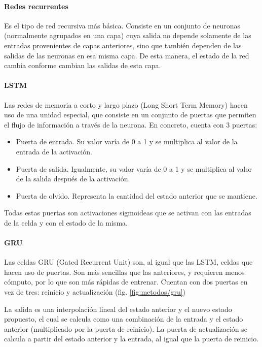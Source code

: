 \paragraph{Redes recurrentes}
Es el tipo de red recursiva más básica. Consiste en un conjunto de neuronas (normalmente agrupados en una capa) cuya salida no depende solamente de las entradas provenientes de capas anteriores, sino que también dependen de las salidas de las neuronas en esa misma capa. De esta manera, el estado de la red cambia conforme cambian las salidas de esta capa.
\paragraph{LSTM}
Las redes de memoria a corto y largo plazo (Long Short Term Memory) \cite{hochreiter1997long}\cite{colah} hacen uso de una unidad especial, que consiste en un conjunto de puertas que permiten el flujo de información a través de la neurona. En concreto, cuenta con 3 puertas:

\begin{itemize}
	\item Puerta de entrada. Su valor varía de 0 a 1 y se multiplica al valor de la entrada de la activación.
	\item Puerta de salida. Igualmente, su valor varía de 0 a 1 y se multiplica al valor de la salida después de la activación.
	\item Puerta de olvido. Representa la cantidad del estado anterior que se mantiene.
\end{itemize}

Todas estas puertas son activaciones sigmoideas que se activan con las entradas de la celda y con el estado de la misma.
\paragraph{GRU}
Las celdas GRU (Gated Recurrent Unit) \cite{chung2014empirical} son, al igual que las LSTM, celdas que hacen uso de puertas. Son más sencillas que las anteriores, y requieren menos cómputo, por lo que son más rápidas de entrenar. Cuentan con dos puertas en vez de tres: reinicio y actualización (fig. \ref{fig:metodos/gru})

La salida es una interpolación lineal del estado anterior y el nuevo estado propuesto, el cual se calcula como una combinación de la entrada y el estado anterior (multiplicado por la puerta de reinicio). La puerta de actualización se calcula a partir del estado anterior y la entrada, al igual que la puerta de reinicio.

